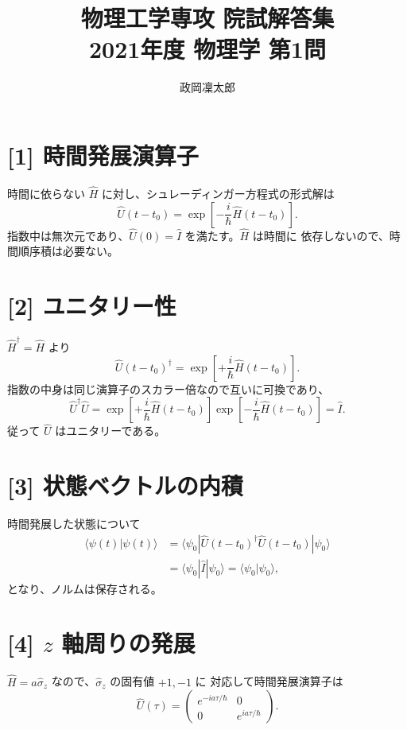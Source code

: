 \documentclass[11pt,a4paper]{article}
\title{物理工学専攻 院試解答集\\2021年度 物理学 第1問}
\author{政岡凜太郎}
\date{}
\begin{document}
\maketitle

\section*{[1] 時間発展演算子}
時間に依らない $\hat H$ に対し、シュレーディンガー方程式の形式解は
\begin{equation}
 \boxed{\hat U(t-t_0)=
       \exp\!\left[-\frac{i}{\hbar}\hat H(t-t_0)\right]}.
 \label{eq:U-general}
\end{equation}
指数中は無次元であり、$\hat U(0)=\hat I$ を満たす。$\hat H$ は時間に
依存しないので、時間順序積は必要ない。

\section*{[2] ユニタリー性}
$\hat H^\dagger=\hat H$ より
\[
 \hat U(t-t_0)^\dagger=
 \exp\!\left[+\frac{i}{\hbar}\hat H(t-t_0)\right].
\]
指数の中身は同じ演算子のスカラー倍なので互いに可換であり、
\begin{equation}
 \hat U^\dagger\hat U
 =\exp\!\left[+\frac{i}{\hbar}\hat H(t-t_0)\right]
  \exp\!\left[-\frac{i}{\hbar}\hat H(t-t_0)\right]
 =\hat I.
\end{equation}
従って $\hat U$ はユニタリーである。

\section*{[3] 状態ベクトルの内積}
時間発展した状態について
\begin{align}
 \langle\psi(t)|\psi(t)\rangle
 &=\langle\psi_0|\hat U(t-t_0)^\dagger
                     \hat U(t-t_0)|\psi_0\rangle\\
 &=\langle\psi_0|\hat I|\psi_0\rangle
 =\langle\psi_0|\psi_0\rangle,
\end{align}
となり、ノルムは保存される。

\section*{[4] $z$ 軸周りの発展}
$\hat H=a\hat\sigma_z$ なので、$\hat\sigma_z$ の固有値 $+1,-1$ に
対応して時間発展演算子は
\begin{equation}
 \boxed{\hat U(\tau)=
 \begin{pmatrix}
  e^{-ia\tau/\hbar}&0\\
  0&e^{ia\tau/\hbar}
 \end{pmatrix}}.
\end{equation}
\end{document}
